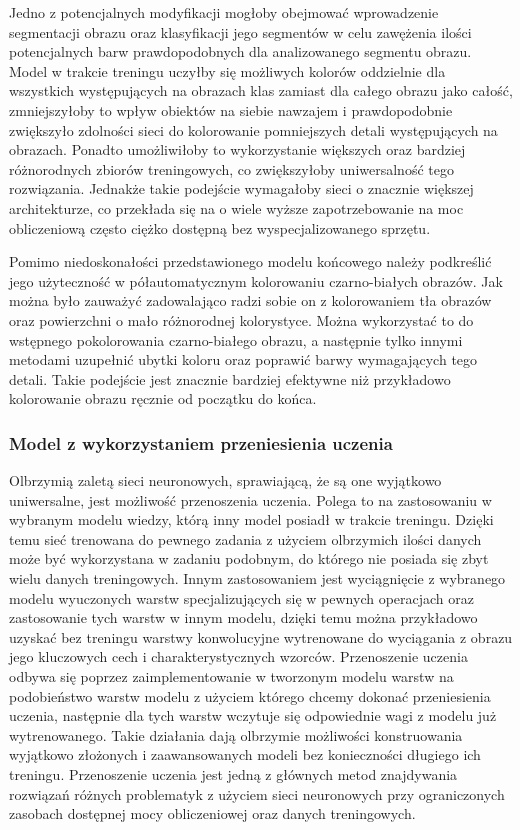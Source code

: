   Jedno z potencjalnych modyfikacji mogłoby obejmować
  wprowadzenie segmentacji obrazu oraz klasyfikacji jego segmentów w celu
  zawężenia ilości potencjalnych barw prawdopodobnych dla analizowanego segmentu obrazu.
  Model w trakcie treningu uczyłby się możliwych kolorów oddzielnie dla wszystkich
  występujących na obrazach klas zamiast dla całego obrazu jako całość,
  zmniejszyłoby to wpływ obiektów na siebie nawzajem i prawdopodobnie zwiększyło
  zdolności sieci do kolorowanie pomniejszych detali występujących na obrazach.
  Ponadto umożliwiłoby to wykorzystanie większych oraz bardziej różnorodnych
  zbiorów treningowych, co zwiększyłoby uniwersalność tego rozwiązania.
  Jednakże takie podejście wymagałoby sieci o znacznie większej architekturze,
  co przekłada się na o wiele wyższe zapotrzebowanie na moc obliczeniową często
  ciężko dostępną bez wyspecjalizowanego sprzętu.

  Pomimo niedoskonałości przedstawionego modelu końcowego należy podkreślić jego
  użyteczność w półautomatycznym kolorowaniu czarno-białych obrazów. Jak można
  było zauważyć zadowalająco radzi sobie on z kolorowaniem tła obrazów oraz
  powierzchni o mało różnorodnej kolorystyce. Można wykorzystać to do wstępnego
  pokolorowania czarno-białego obrazu, a następnie tylko innymi metodami uzupełnić
  ubytki koloru oraz poprawić barwy wymagających tego detali. Takie podejście
  jest znacznie bardziej efektywne niż przykładowo kolorowanie obrazu ręcznie od
  początku do końca.


  \subsubsection{Model z wykorzystaniem przeniesienia uczenia}

  Olbrzymią zaletą sieci neuronowych, sprawiającą, że są one wyjątkowo
  uniwersalne, jest możliwość przenoszenia uczenia. Polega
  to na zastosowaniu w wybranym modelu wiedzy, którą inny model posiadł w trakcie
  treningu. Dzięki temu sieć trenowana do pewnego zadania z użyciem olbrzymich
  ilości danych może być wykorzystana w zadaniu podobnym, do którego nie
  posiada się zbyt wielu danych treningowych. Innym zastosowaniem jest
  wyciągnięcie z wybranego modelu wyuczonych warstw specjalizujących się w
  pewnych operacjach oraz zastosowanie tych warstw w innym modelu, dzięki
  temu można przykładowo uzyskać bez treningu warstwy konwolucyjne wytrenowane
  do wyciągania z obrazu jego kluczowych cech i charakterystycznych wzorców.
  Przenoszenie uczenia odbywa się poprzez zaimplementowanie w tworzonym modelu
  warstw na podobieństwo warstw modelu z użyciem którego chcemy dokonać
  przeniesienia uczenia, następnie dla tych warstw wczytuje się odpowiednie wagi
  z modelu już wytrenowanego.
  Takie działania dają olbrzymie możliwości konstruowania wyjątkowo złożonych i
  zaawansowanych modeli bez konieczności długiego ich treningu. Przenoszenie
  uczenia jest jedną z głównych metod znajdywania rozwiązań różnych problematyk
  z użyciem sieci neuronowych przy ograniczonych zasobach dostępnej mocy
  obliczeniowej oraz danych treningowych.

